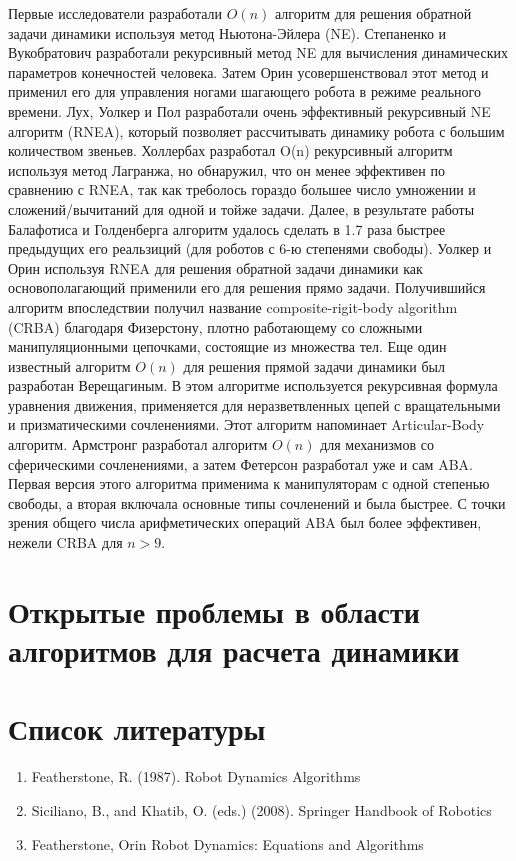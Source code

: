 \documentclass[a4paper,14pt]{extreport}
\begin{document}
Первые исследователи разработали $O(n)$ алгоритм для решения обратной задачи динамики используя метод Ньютона-Эйлера (NE). Степаненко и Вукобратович разработали рекурсивный метод NE для вычисления динамических параметров конечностей человека. Затем Орин усовершенствовал этот метод и применил его для управления ногами шагающего робота в режиме реального времени. Лух, Уолкер и Пол разработали очень эффективный рекурсивный NE алгоритм (RNEA), который позволяет рассчитывать динамику робота с большим количеством звеньев. Холлербах разработал O(n) рекурсивный алгоритм используя метод Лагранжа, но обнаружил, что он менее эффективен по сравнению с RNEA, так как треболось гораздо большее число умножении и сложений/вычитаний для одной и тойже задачи. Далее, в результате работы Балафотиса и Голденберга алгоритм удалось сделать в 1.7 раза быстрее предыдущих его реальзиций (для роботов с 6-ю степенями свободы).
Уолкер и Орин используя RNEA для решения обратной задачи динамики как основополагающий применили его для решения прямо задачи. Получившийся алгоритм впоследствии получил название composite-rigit-body algorithm (CRBA) благодаря Физерстону, плотно работающему со сложными манипуляционными цепочками, состоящие из множества тел.
Еще один известный алгоритм $O(n)$ для решения прямой задачи динамики был разработан Верещагиным. В этом алгоритме используется рекурсивная формула уравнения движения, применяется для неразветвленных цепей с вращательными и призматическими сочленениями. Этот алгоритм напоминает Articular-Body алгоритм. Армстронг разработал алгоритм $O(n)$ для механизмов со сферическими сочленениями, а затем Фетерсон разработал уже и сам ABA. Первая версия этого алгоритма применима к манипуляторам с одной степенью свободы, а вторая включала основные типы сочленений и была быстрее. С точки зрения общего  числа арифметических операций ABA был более эффективен, нежели CRBA для $n > 9$.


\section{Открытые проблемы в области алгоритмов для расчета динамики}

\newpage
\section{Список литературы}

\begin{enumerate}
	\item  Featherstone, R. (1987). Robot Dynamics Algorithms
	\item Siciliano, B., and Khatib, O. (eds.) (2008). Springer Handbook of Robotics
	\item Featherstone, Orin Robot Dynamics: Equations and Algorithms
\end{enumerate}
	
\end{document}
